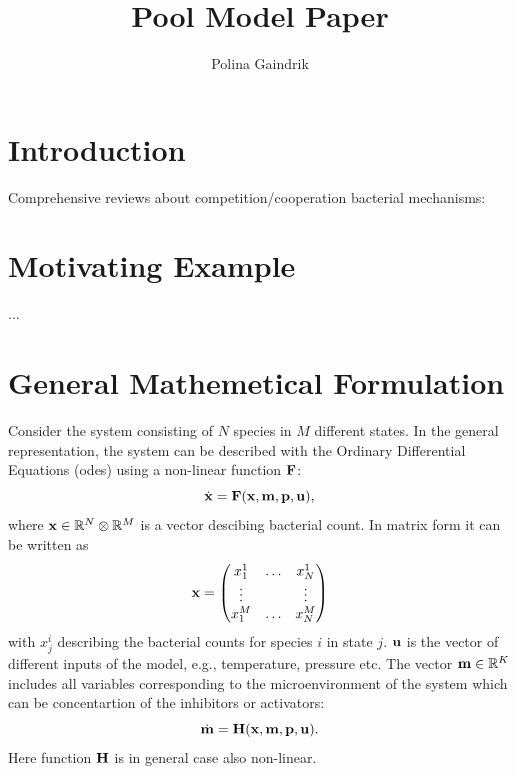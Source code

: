 \documentclass[10pt,A4paper]{article}
\title{Pool Model Paper}
\author{Polina Gaindrik}
\begin{document}
\maketitle

\tableofcontents

\newpage

\section{Introduction}

Comprehensive reviews about competition/cooperation bacterial mechanisms: \cite{ghoul_ecology_2016, stubbendieck_bacterial_2016, hibbing_bacterial_2010, west_social_2007}

\section{Motivating Example}

...



\section{General Mathemetical Formulation}
Consider the system consisting of $N$ species in $M$ different states.
In the general representation, the system can be described with the Ordinary Differential Equations (\acp{ode}) using a non-linear function $\mathbf{F}$:
\begin{equation}
   \dot{\mathbf{x}} = \mathbf{F}(\mathbf{x}, \mathbf{m}, \mathbf{p}, \mathbf{u}),
   \label{eq:model_ODE}
\end{equation}
where  $\mathbf{x} \in \mathbb{R}^{N}  \otimes \mathbb{R}^{M}$ is a vector descibing bacterial count.
In matrix form it can be written as
\begin{equation}
    \mathbf{x} = \begin{pmatrix}
        x^1_1  & \dots & x^1_N  \\
        \vdots &       & \vdots \\
        x^M_1  & \dots & x^M_N  \\
            \end{pmatrix}
    \label{eq:model_bact}
\end{equation}
with $x_{j}^{i}$ describing the bacterial counts for species $i$ in state $j$.
$\mathbf{u}$ is the vector of different inputs of the model, e.g., temperature, pressure etc.
The vector $\mathbf{m} \in \mathbb{R}^{K}$ includes all variables corresponding to the microenvironment of the system which can be concentartion of the inhibitors or activators:
\begin{equation}
    \dot{\mathbf{m}} = \mathbf{H} (\mathbf{x}, \mathbf{m}, \mathbf{p}, \mathbf{u}).
    \label{eq:model_microenv}
\end{equation}
Here function $\mathbf{H}$ is in general case also non-linear.
\end{document}
